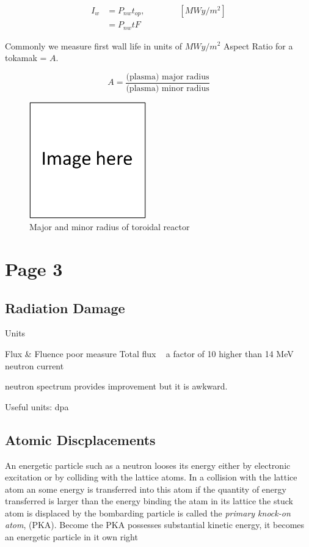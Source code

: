 \documentclass[11pt]{article}
\begin{document}
\begin{align}
I_w &= P_{nw} t_{op},  \qquad \qquad [MW y/m^2]     \\
	&= P_{nw} t F
\end{align}

Commonly we measure first wall life in units of $MW y/m^2$
Aspect Ratio for a tokamak = $A$.

\begin{equation}
	A = \frac{\text{(plasma) major radius}}{\text{(plasma) minor radius}}
\end{equation}

\begin{figure}[!htp]
\centering
\includegraphics[width=0.45\textwidth]{figs/fillImage.png}
\caption[width=\textwidth]{Major and minor radius of toroidal reactor}
\label{fig:reactorRadius}
\end{figure}

\section{Page 3}

\subsection{Radiation Damage}
Units

Flux \& Fluence poor measure
Total flux ~ a factor of 10 higher than 14 MeV neutron current

neutron spectrum provides improvement but it is awkward.

Useful units: dpa

\subsection{Atomic Discplacements}
An energetic particle such as a neutron looses its energy either by electronic excitation or by colliding with the lattice atoms. In a collision with the lattice atom an some energy is transferred into this atom if the quantity of energy transferred is larger than the energy binding the atam in its lattice the stuck atom is displaced by the bombarding particle is called the \textit{primary knock-on atom}, (PKA). Become the PKA possesses substantial kinetic energy, it becomes an energetic particle in it own right
\end{document}
